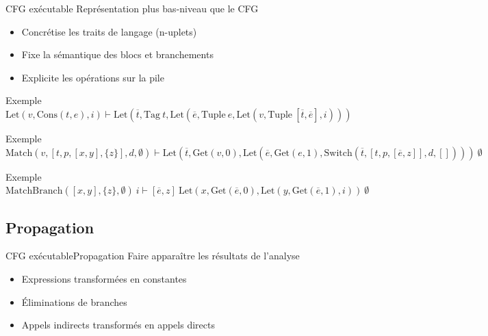 \documentclass{beamer}
\begin{document}
\begin{frame}{CFG exécutable}
    Représentation plus bas-niveau que le CFG

    \begin{itemize}
        \item Concrétise les traits de langage (n-uplets)
        \item Fixe la sémantique des blocs et branchements
        \item Explicite les opérations sur la pile
    \end{itemize}



    \begin{exampleblock}{Exemple}
        $\text{Let}(v, \text{Cons}(t, e), i) \vdash \text{Let}(\overline{t}, \text{Tag} ~ t, \text{Let}(\overline{e}, \text{Tuple} ~ e, \text{Let}(v, \text{Tuple} ~ [\overline{t}, \overline{e}], i)))$
    \end{exampleblock}




    \begin{exampleblock}{Exemple}
        $\text{Match}(v, [t, p, [x, y], \lbrace z \rbrace], d, \emptyset) \vdash \text{Let}(\overline{t}, \text{Get}(v, 0), \text{Let}(\overline{e}, \text{Get}(e, 1), \text{Switch}(\overline{t}, [t, p, [\overline{e}, z]], d, []))) ~ \emptyset$
    \end{exampleblock}

    \begin{exampleblock}{Exemple}
        $\text{MatchBranch}([x, y], \lbrace z \rbrace, \emptyset) ~ i \vdash [\overline{e}, z] ~ \text{Let}(x, \text{Get}(\overline{e}, 0), \text{Let}(y, \text{Get}(\overline{e}, 1), i)) ~ \emptyset$
    \end{exampleblock}
\end{frame}

\subsection{Propagation}

\begin{frame}{CFG exécutable}{Propagation}
    Faire apparaître les résultats de l'analyse

    \begin{itemize}
        \item Expressions transformées en constantes
        \item Éliminations de branches
        \item Appels indirects transformés en appels directs
    \end{itemize}
\end{frame}
\end{document}
